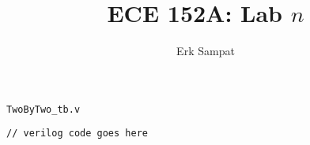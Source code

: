 \title{{\selectfont ECE 152A: } Lab $n$}
\author{Erk Sampat}



\maketitle
\labpart
\begin{step}
	\subpart
	\texttt{TwoByTwo\_tb.v}
	\begin{lstlisting}[style={verilog-style}]
		// verilog code goes here
	\end{lstlisting}
\end{step}
\labpart
